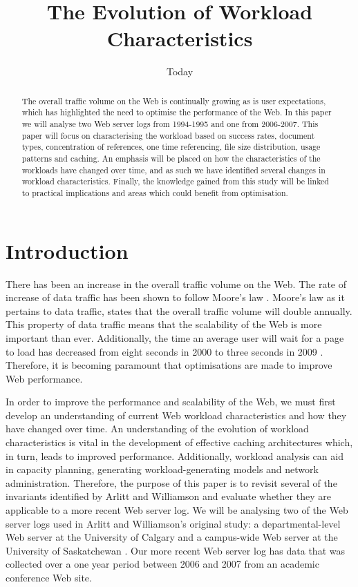 \documentclass[10pt,conference]{IEEEtran}
\title{The Evolution of Workload Characteristics}
\author{\IEEEauthorblockN{Chelsea Farley, Ryan Lewis, David Armstrong, Rina Gao and Ryunosuke Madenokoji}
\IEEEauthorblockA{The University of Auckland}}
\date{Today}
\begin{document}
\maketitle

\begin{abstract}
The overall traffic volume on the Web is continually growing as is user expectations, which has highlighted the need to optimise the performance of the Web. In this paper we will analyse two Web server logs from 1994-1995 and one from 2006-2007. This paper will focus on characterising the workload based on success rates, document types, concentration of references, one time referencing, file size distribution, usage patterns and caching. An emphasis will be placed on how the characteristics of the workloads have changed over time, and as such we have identified several changes in workload characteristics. Finally, the knowledge gained from this study will be linked to practical implications and areas which could benefit from optimisation.
\end{abstract}

\section{Introduction}
There has been an increase in the overall traffic volume on the Web. The rate of increase of data traffic has been shown to follow Moore's law \cite{williams05}. Moore's law as it pertains to data traffic, states that the overall traffic volume will double annually. This property of data traffic means that the scalability of the Web is more important than ever. Additionally, the time an average user will wait for a page to load has decreased from eight seconds in 2000 to three seconds in 2009 \cite{Butkiewicz}. Therefore, it is becoming paramount that optimisations are made to improve Web performance.

In order to improve the performance and scalability of the Web, we must first develop an understanding of current Web workload characteristics and how they have changed over time. An understanding of the evolution of workload characteristics is vital in the development of effective caching architectures which, in turn, leads to improved performance. Additionally, workload analysis can aid in capacity planning, generating workload-generating models and network administration. Therefore, the purpose of this paper is to revisit several of the invariants identified by Arlitt and Williamson \cite{keynote} and evaluate whether they are applicable to a more recent Web server log. We will be analysing two of the Web server logs used in Arlitt and Williamson's original study: a departmental-level Web server at the University of Calgary and a campus-wide Web server at the University of Saskatchewan \cite{keynote}. Our more recent Web server log has data that was collected over a one year period between 2006 and 2007 from an academic conference Web site.
\end{document}
